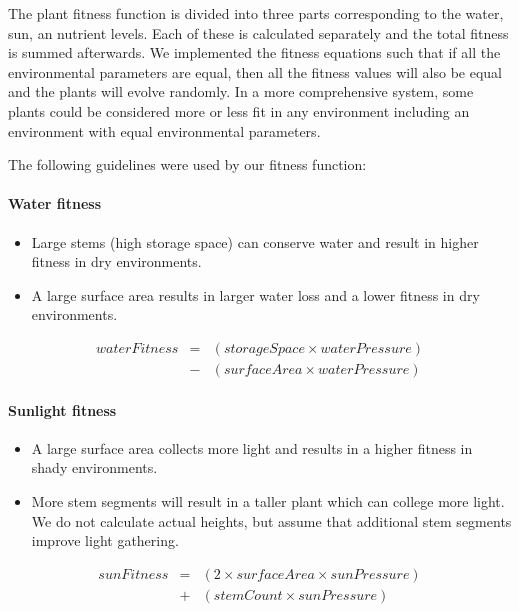 \documentclass[conference]{acmsiggraph}
\begin{document}
The plant fitness function is divided into three parts corresponding to the
water, sun, an nutrient levels. Each of these is calculated separately and the
total fitness is summed afterwards. We implemented the fitness equations such
that if all the environmental parameters are equal, then all the fitness values
will also be equal and the plants will evolve randomly. In a more comprehensive
system, some plants could be considered more or less fit in any environment
including an environment with equal environmental parameters.

The following guidelines were used by our fitness function:

\paragraph{Water fitness}
\begin{itemize}
  \item Large stems (high storage space) can conserve water and result in higher
    fitness in dry environments.
  \item A large surface area results in larger water loss and a lower
    fitness in dry environments.
\end{itemize}
\vspace{-0.5em}
\begin{eqnarray*}
waterFitness &=& (storageSpace \times waterPressure) \\
             &-& (surfaceArea \times waterPressure)
\end{eqnarray*}

\paragraph{Sunlight fitness}
\begin{itemize}
  \item A large surface area collects more light and results in a higher fitness
    in shady environments.
  \item More stem segments will result in a taller plant which can college more
    light. We do not calculate actual heights, but assume that additional stem
    segments improve light gathering.
\end{itemize}
\vspace{-0.5em}
\begin{eqnarray*}
sunFitness &=& (2 \times surfaceArea \times sunPressure) \\
           &+& (stemCount \times sunPressure)
\end{eqnarray*}
\end{document}
